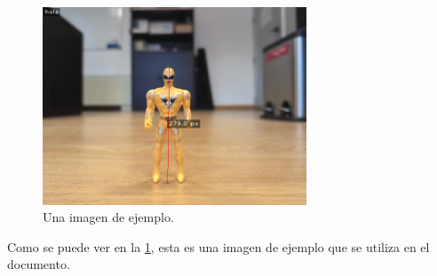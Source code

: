 \documentclass[12pt]{article}
\begin{document}
\begin{figure}[h!]
    \centering
    \includegraphics[width=0.7\textwidth]{images_calibracion/Altura_objeto.png} 
    \caption{Una imagen de ejemplo.}
    \label{fig:imagen_ejemplo}
\end{figure}

Como se puede ver en la \ref{fig:imagen_ejemplo}, esta es una imagen de ejemplo que se utiliza en el documento.
\end{document}
